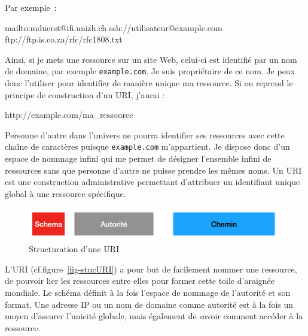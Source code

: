 Par exemple~:

\begin{termc}[backgroundcolor=\color{palerod}, language=json, basicstyle=\ttfamily, escapechar=@]
mailto:mduerst@ifi.unizh.ch
ssh://utilisateur@example.com
ftp://ftp.is.co.za/rfc/rfc1808.txt
\end{termc}


      \vspace{1em}

Ainsi, si je mets une ressource sur un site Web, celui-ci est identifié par un nom de domaine, par exemple \texttt{example.com}. Je suis propriétaire de ce nom. Je peux donc l’utiliser pour identifier de manière unique ma ressource. Si on reprend le principe de construction d’un URI, j’aurai :

\begin{termc}[backgroundcolor=\color{palerod}, language=json, basicstyle=\ttfamily, escapechar=@]
http://example.com/ma_ressource
\end{termc}


Personne d’autre dans l’univers ne pourra identifier ses ressources avec cette chaîne de caractères puisque \texttt{example.com} m’appartient. Je dispose donc d’un espace de nommage infini qui me permet de désigner l’ensemble infini de ressources sans que personne d’autre ne puisse prendre les mêmes noms. Un \ac{URI} est une construction administrative permettant d’attribuer un identifiant unique global à une ressource spécifique.


  \begin{figure}[tbp]
\centerline{\includegraphics[width=1\columnwidth]{Pictures/Capture15.png}}
\caption{Structuration d'une URI}
\label{fig-stucURI}
\end{figure}

L’\ac{URI} (cf.figure~\vref{fig-stucURI}) a pour but de facilement nommer une ressource, de pouvoir lier les ressources entre elles pour former cette toile d’araignée mondiale. Le schéma définit à la fois l'espace de nommage de l'autorité et son format. Une adresse \ac{IP} ou un nom de domaine comme autorité est à la fois un moyen d'assurer l'unicité globale, mais également de savoir comment accéder à la ressource. 

      \vspace{1em}

